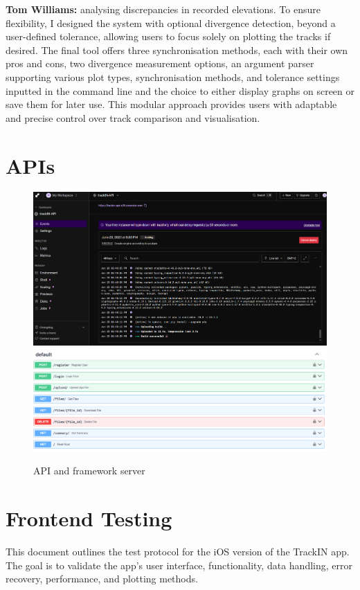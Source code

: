 \documentclass[12pt]{article}
\begin{document}
\clearpage

 \noindent\textbf{Tom Williams:} analysing discrepancies in recorded elevations. To ensure flexibility, I designed the system with optional divergence detection, beyond a user-defined tolerance, allowing users to focus solely on plotting the tracks if desired. The final tool offers three synchronisation methods, each with their own pros and cons, two divergence measurement options, an argument parser supporting various plot types, synchronisation methods, and tolerance settings inputted in the command line and the choice to either display graphs on screen or save them for later use. This modular approach provides users with adaptable and precise control over track comparison and visualisation.

\section{APIs}
\begin{figure}[h!]
    \centering
    \includegraphics[width=\textwidth]{Project_Screenshots/API.png}
    \includegraphics[width=\textwidth]{Project_Screenshots/API2.png}
    \caption{API and framework server }
\end{figure}


\section{Frontend Testing}
\newpage
This document outlines the test protocol for the iOS version of the TrackIN app. The goal is to validate the app’s user interface, functionality, data handling, error recovery, performance, and plotting methods.
\end{document}
